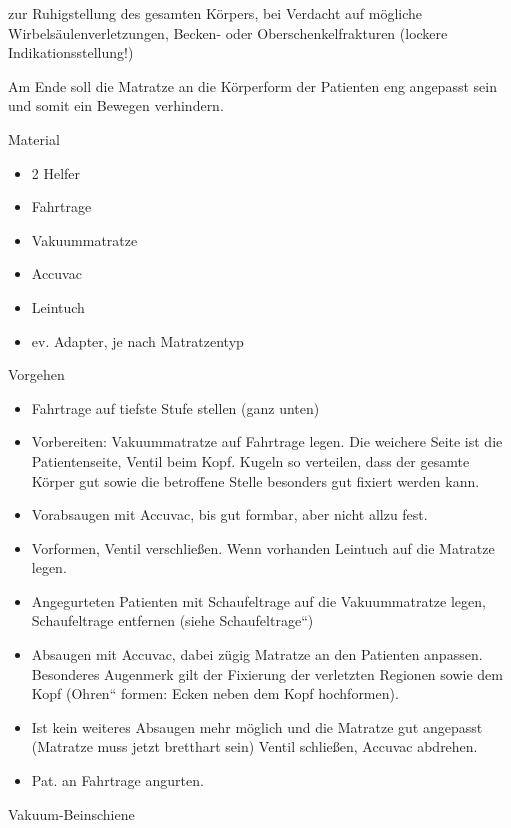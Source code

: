 \documentclass{article}
\begin{document}
zur Ruhigstellung des gesamten K\"orpers, bei Verdacht auf m\"ogliche
Wirbels\"aulenverletzungen, Becken- oder Oberschenkelfrakturen (lockere
Indikationsstellung!)

Am Ende soll die Matratze an die K\"orperform der Patienten eng
angepasst sein und somit ein Bewegen verhindern.

Material

\begin{itemize}
\item 2 Helfer

\item Fahrtrage

\item Vakuummatratze

\item Accuvac

\item Leintuch

\item ev. Adapter, je nach Matratzentyp

\end{itemize}
Vorgehen

\begin{itemize}
\item Fahrtrage auf tiefste Stufe stellen (ganz unten)

\item Vorbereiten: Vakuummatratze auf Fahrtrage legen. Die weichere
Seite ist die Patientenseite, Ventil beim Kopf. Kugeln so verteilen,
dass der gesamte K\"orper gut sowie die betroffene Stelle besonders gut
fixiert werden kann.

\item Vorabsaugen mit Accuvac, bis gut formbar, aber nicht allzu fest.

\item Vorformen, Ventil verschlie{\ss}en. Wenn vorhanden Leintuch auf
die Matratze legen.

\item Angegurteten Patienten mit Schaufeltrage auf die Vakuummatratze
legen, Schaufeltrage entfernen (siehe
{\quotedblbase}Schaufeltrage{\textquotedblleft})

\item Absaugen mit Accuvac, dabei z\"ugig Matratze an den Patienten
anpassen. Besonderes Augenmerk gilt der Fixierung der verletzten
Regionen sowie dem Kopf ({\quotedblbase}Ohren{\textquotedblleft}
formen: Ecken neben dem Kopf hochformen).

\item Ist kein weiteres Absaugen mehr m\"oglich und die Matratze gut
angepasst (Matratze muss jetzt bretthart sein) Ventil schlie{\ss}en,
Accuvac abdrehen.

\item Pat. an Fahrtrage angurten.

\end{itemize}
Vakuum-Beinschiene
\end{document}
